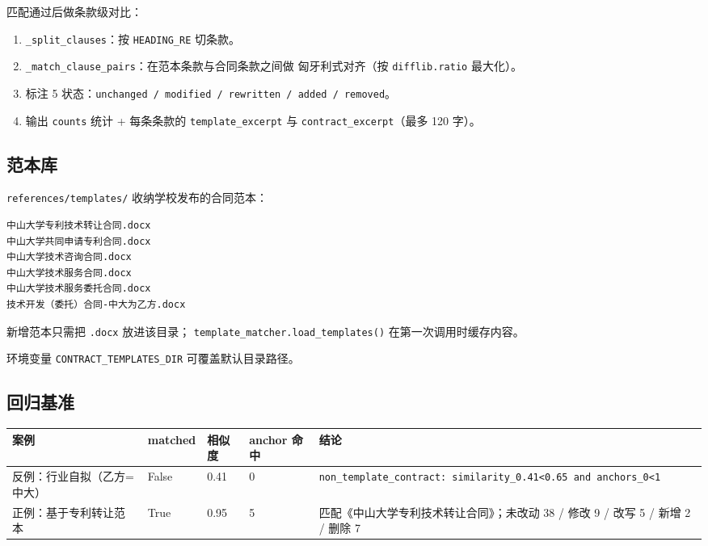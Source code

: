 \documentclass[11pt,a4paper]{article}
\begin{document}
匹配通过后做条款级对比：

\begin{enumerate}[leftmargin=1.4em,itemsep=1pt]
  \item \texttt{\_split\_clauses}：按 \texttt{HEADING\_RE} 切条款。
  \item \texttt{\_match\_clause\_pairs}：在范本条款与合同条款之间做
    匈牙利式对齐（按 \texttt{difflib.ratio} 最大化）。
  \item 标注 5 状态：\texttt{unchanged / modified / rewritten /
    added / removed}。
  \item 输出 \texttt{counts} 统计 + 每条条款的 \texttt{template\_excerpt}
    与 \texttt{contract\_excerpt}（最多 120 字）。
\end{enumerate}

\subsection{范本库}

\texttt{references/templates/} 收纳学校发布的合同范本：

\begin{lstlisting}[style=shell]
中山大学专利技术转让合同.docx
中山大学共同申请专利合同.docx
中山大学技术咨询合同.docx
中山大学技术服务合同.docx
中山大学技术服务委托合同.docx
技术开发（委托）合同-中大为乙方.docx
\end{lstlisting}

新增范本只需把 \texttt{.docx} 放进该目录；
\texttt{template\_matcher.load\_templates()} 在第一次调用时缓存内容。

环境变量 \texttt{CONTRACT\_TEMPLATES\_DIR} 可覆盖默认目录路径。

\subsection{回归基准}

\begin{longtable}{p{4.0cm} p{1.4cm} p{1.4cm} p{1.4cm} p{6.0cm}}
\toprule
\textbf{案例} & \textbf{matched} & \textbf{相似度} & \textbf{anchor 命中}
& \textbf{结论} \\ \midrule
\endhead
反例：行业自拟（乙方=中大） & False & 0.41 & 0
& \texttt{non\_template\_contract:\ similarity\_0.41<0.65 and anchors\_0<1} \\
正例：基于专利转让范本 & True & 0.95 & 5
& 匹配《中山大学专利技术转让合同》；未改动 38 / 修改 9 / 改写 5 /
新增 2 / 删除 7 \\
\bottomrule
\end{longtable}
\end{document}
